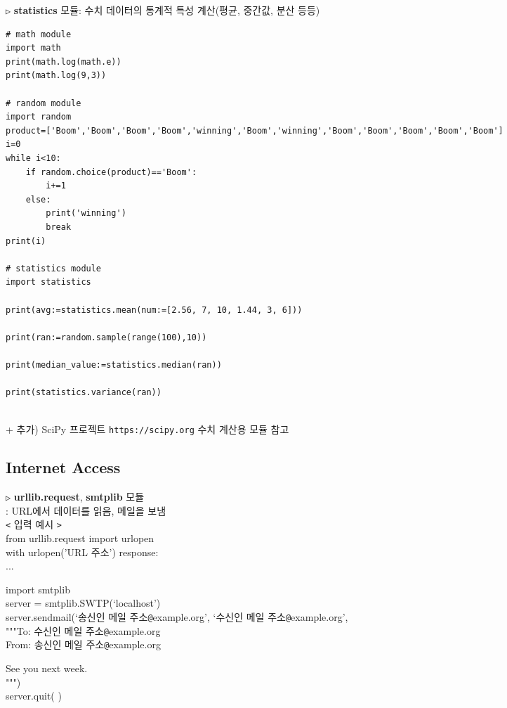 \documentclass[11pt,a4paper]{article}
\begin{document}
\begin{spacing}{1.5}
\texttt{▷} \textbf{statistics} 모듈: 수치 데이터의 통계적 특성 계산(평균, 중간값, 분산 등등)\\
\begin{lstlisting}[label={list:first}]
# math module
import math
print(math.log(math.e))
print(math.log(9,3))

# random module
import random
product=['Boom','Boom','Boom','Boom','winning','Boom','winning','Boom','Boom','Boom','Boom','Boom']
i=0
while i<10:
    if random.choice(product)=='Boom':
        i+=1
    else:
        print('winning')
        break
print(i)

# statistics module
import statistics

print(avg:=statistics.mean(num:=[2.56, 7, 10, 1.44, 3, 6]))

print(ran:=random.sample(range(100),10))

print(median_value:=statistics.median(ran))

print(statistics.variance(ran))
\end{lstlisting}\\
+  추가)  SciPy 프로젝트   \verb|https://scipy.org|  수치 계산용 모듈 참고\\

\subsection{\Large\textbf{Internet Access}}
\texttt{▷} \textbf{urllib.request}, \textbf{smtplib} 모듈\\
: URL에서 데이터를 읽음, 메일을 보냄\\

\hspace*{5em}\texttt{<} 입력 예시  \texttt{>}\\
from urllib.request import urlopen\\
with urlopen('URL 주소') response:\\
    ...

import smtplib\\
server = smtplib.SWTP(`localhost')\\
server.sendmail(`송신인 메일 주소\texttt{@}example.org', `수신인 메일 주소\texttt{@}example.org',\\
"""To: 수신인 메일 주소\texttt{@}example.org\\
From: 송신인 메일 주소\texttt{@}example.org

See you next week.\\
""")\\
server.quit( )\\


\end{spacing}
\end{document}
